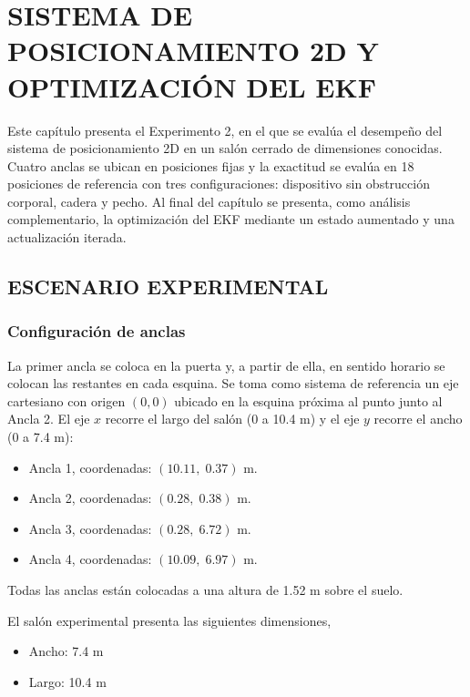 \chapter{SISTEMA DE POSICIONAMIENTO 2D Y OPTIMIZACIÓN DEL EKF}
\label{sec:desempeno_posicionamiento}
\label{ch:optimizacion_kalman}
Este capítulo presenta el Experimento 2, en el que se evalúa el desempeño del sistema de posicionamiento 2D en un salón cerrado de dimensiones conocidas. Cuatro anclas se ubican en posiciones fijas y la exactitud se evalúa en 18 posiciones de referencia con tres configuraciones: dispositivo sin obstrucción corporal, cadera y pecho. Al final del capítulo se presenta, como análisis complementario, la optimización del EKF mediante un estado aumentado y una actualización iterada.


\section{ESCENARIO EXPERIMENTAL}
\label{sec:escenario_experimental_2d}

\subsection{Configuración de anclas}

La primer ancla se coloca en la puerta y, a partir de ella, en sentido horario se colocan las restantes en cada esquina. Se toma como sistema de referencia un eje cartesiano con origen $(0,0)$ ubicado en la esquina próxima al punto junto al Ancla 2. El eje $x$ recorre el largo del salón (0 a 10.4 m) y el eje $y$ recorre el ancho (0 a 7.4 m):

\begin{itemize}
    \item Ancla 1, coordenadas: $(10.11,\;0.37)$ m.
    \item Ancla 2, coordenadas: $(0.28,\;0.38)$ m.
    \item Ancla 3, coordenadas: $(0.28,\;6.72)$ m.
    \item Ancla 4, coordenadas: $(10.09,\;6.97)$ m.
\end{itemize}

Todas las anclas están colocadas a una altura de 1.52 m sobre el suelo.

El salón experimental presenta las siguientes dimensiones,
\begin{itemize}
    \item Ancho: 7.4 m
    \item Largo: 10.4 m
\end{itemize}

